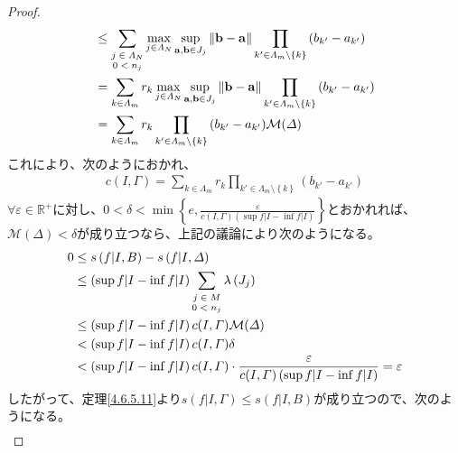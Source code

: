 \documentclass[dvipdfmx]{jsarticle}
\begin{document}
\begin{proof}
\begin{align*}
&\leq \sum_{\scriptsize \begin{matrix}
j \in \varLambda_{N} \\
0 < n_{j} \\
\end{matrix}} {\max_{j \in \varLambda_{N}}{\sup_{\mathbf{a},\mathbf{b} \in J_{j}}\left\| \mathbf{b} - \mathbf{a} \right\|}\prod_{k' \in \varLambda_{m} \setminus \left\{ k \right\}} \left( b_{k'} - a_{k'} \right)}\\
&= \sum_{k \in \varLambda_{m} } {r_{k}\max_{j \in \varLambda_{N}}{\sup_{\mathbf{a},\mathbf{b} \in J_{j}}\left\| \mathbf{b} - \mathbf{a} \right\|}\prod_{k' \in \varLambda_{m} \setminus \left\{ k \right\}} \left( b_{k'} - a_{k'} \right)}\\
&= \sum_{k \in \varLambda_{m} } {r_{k}\prod_{k' \in \varLambda_{m} \setminus \left\{ k \right\}} \left( b_{k'} - a_{k'} \right)}\mathcal{M}(\varDelta)
\end{align*}
これにより、次のようにおかれ、
\begin{align*}
c(I,\varGamma) = \sum_{k \in \varLambda_{m} } {r_{k}\prod_{k' \in \varLambda_{m} \setminus \left\{ k \right\}} \left( b_{k'} - a_{k'} \right)}
\end{align*}
$\forall\varepsilon \in \mathbb{R}^{+}$に対し、$0 < \delta < \min\left\{ e,\frac{\varepsilon}{c(I,\varGamma)\left( \sup{f|I} - \inf{f|I} \right)} \right\}$とおかれれば、$\mathcal{M}(\varDelta) < \delta$が成り立つなら、上記の議論により次のようになる。
\begin{align*}
0 &\leq s\left( f|I,B \right) - s\left( f|I,\varDelta \right)\\
&\leq \left( \sup{f|I} - \inf{f|I} \right)\sum_{\scriptsize \begin{matrix}
j \in M \\
0 < n_{j} \\
\end{matrix}} {\lambda\left( J_{j} \right)}\\
&\leq \left( \sup{f|I} - \inf{f|I} \right)c(I,\varGamma)\mathcal{M}(\varDelta)\\
&< \left( \sup{f|I} - \inf{f|I} \right)c(I,\varGamma)\delta\\
&< \left( \sup{f|I} - \inf{f|I} \right)c(I,\varGamma) \cdot \frac{\varepsilon}{c(I,\varGamma)\left( \sup{f|I} - \inf{f|I} \right)} = \varepsilon
\end{align*}
したがって、定理\ref{4.6.5.11}より$s\left( f|I,\varGamma \right) \leq s\left( f|I,B \right)$が成り立つので、次のようになる。
\begin{align*}

\end{align*}
\end{proof}
\end{document}
